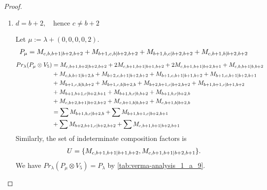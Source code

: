\begin{proof}
\begin{enumerate}
\begin{enumerate}
\begin{enumerate}
\item $ d = b+2, \quad \text{hence } c\neq b+2 $ \par
        Let $\mu:=\lambda + (0,0,0,0,2) $.
        \begin{equation}\notag
          \begin{aligned}
            P_\mu = M_{c,b,b+1|b+2,b+2}
+ M_{b+1,c,b|b+2,b+2}
+ M_{b+1,b,c|b+2,b+2}
+ M_{c,b+1,b|b+2,b+2}
          \end{aligned}
        \end{equation}
        \begin{equation}\notag
          \begin{aligned}
            Pr_{\lambda}(P_\mu \otimes V_{5}) &=
M_{c,b+1,b+2|b+2,b+2}
+ 2M_{c,b+1,b+1|b+1,b+2}
+ 2M_{c,b+1,b+1|b+2,b+1}
+ M_{c,b,b+1|b,b+2}\\
                                               &
+ M_{c,b,b+1|b+2,b}
+ M_{b+2,c,b+1|b+2,b+2}
+ M_{b+1,c,b+1|b+1,b+2}
+ M_{b+1,c,b+1|b+2,b+1}\\
                                               &
+ M_{b+1,c,b|b,b+2}
+ M_{b+1,c,b|b+2,b}
+ M_{b+2,b+1,c|b+2,b+2}
+ M_{b+1,b+1,c|b+1,b+2}\\
                                               &
+ M_{b+1,b+1,c|b+2,b+1}
+ M_{b+1,b,c|b,b+2}
+ M_{b+1,b,c|b+2,b}\\
                                               &
+ M_{c,b+2,b+1|b+2,b+2}
+ M_{c,b+1,b|b,b+2}
+ M_{c,b+1,b|b+2,b} \\
                                               &=
\sum M_{b+1,b,c|b+2,b}
+ \sum M_{b+1,b+1,c|b+2,b+1}\\
                                               &
+ \sum M_{b+2,b+1,c|b+2,b+2}
+ \sum M_{c,b+1,b+1|b+2,b+1}
          \end{aligned}
        \end{equation}
      Similarly, the set of indeterminate composition factors is 
\begin{equation}\notag
  \begin{aligned}
    U = \{
M_{c,b+1,b+1|b+1,b+2},
M_{c,b+1,b+1|b+2,b+1}
\}.
  \end{aligned}
\end{equation}
       We have $Pr_{\lambda}(P_\mu \otimes V_{5}) = P_\lambda  $ by \cref{tab:verma-analysis_1_a_9}.
\begin{table}[htbp]
\centering
\caption{Calculation of Verma modules in $\operatorname{Filt}(P_*) \setminus \operatorname{Filt}(\prl(P_\lambda \otimes V_{5})) $ } \label{tab:verma-analysis_1_a_9}

\end{table}
\end{enumerate}
\end{enumerate}
\end{enumerate}
\end{proof}
